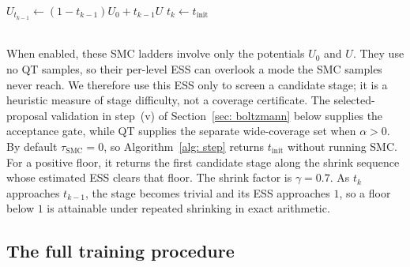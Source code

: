 \documentclass{article}
\begin{document}
\begin{algorithm}[htb]
\caption{Adaptive selection of the stage increment $\Delta t_k$}
\label{alg: step}

$U_{t_{k-1}} \gets (1-t_{k-1}) U_0 + t_{k-1} U$\;
$t_k \gets t_{\mathrm{init}}$\;
\end{algorithm}
\mbox{}\\
When enabled, these SMC ladders involve only the potentials $U_0$ and $U$. They use no QT samples, so their per-level ESS can overlook a mode the SMC samples never reach. We therefore use this ESS only to screen a candidate stage; it is a heuristic measure of stage difficulty, not a coverage certificate. The selected-proposal validation in step~(v) of Section~\ref{sec: boltzmann} below supplies the acceptance gate, while QT supplies the separate wide-coverage set when $\alpha>0$. By default $\tau_{\mathrm{SMC}} = 0$, so Algorithm~\ref{alg: step} returns $t_{\mathrm{init}}$ without running SMC. For a positive floor, it returns the first candidate stage along the shrink sequence whose estimated ESS clears that floor. The shrink factor is $\gamma = 0.7$. As $t_k$ approaches $t_{k-1}$, the stage becomes trivial and its ESS approaches $1$, so a floor below $1$ is attainable under repeated shrinking in exact arithmetic.


\subsection{The full training procedure}
\end{document}
